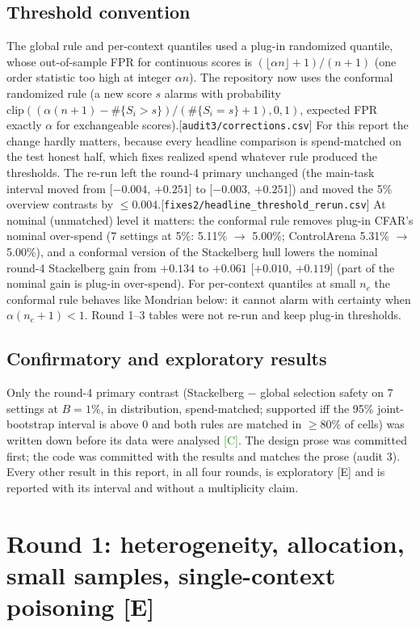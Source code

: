 \documentclass[11pt]{article}
\newcommand{\tC}{\textsf{\scriptsize\textcolor{ForestGreen}{[C]}}\xspace}
\newcommand{\tE}{\textsf{\scriptsize\textcolor{ink2}{[E]}}\xspace}
\newcommand{\src}[1]{{\footnotesize\textcolor{ink2}{[\nolinkurl{#1}]}}}
\begin{document}
\subsection{Threshold convention}\label{sec:thr}
The global rule and per-context quantiles used a plug-in randomized quantile, whose out-of-sample FPR for continuous scores is $(\lfloor\alpha n\rfloor+1)/(n+1)$ (one order statistic too high at integer $\alpha n$). The repository now uses the conformal randomized rule (a new score $s$ alarms with probability $\mathrm{clip}((\alpha(n+1)-\#\{S_i>s\})/(\#\{S_i=s\}+1),0,1)$, expected FPR exactly $\alpha$ for exchangeable scores).\src{audit3/corrections.csv} For this report the change hardly matters, because every headline comparison is spend-matched on the test honest half, which fixes realized spend whatever rule produced the thresholds. The re-run left the round-4 primary unchanged (the main-task interval moved from [$-0.004$, $+0.251$] to [$-0.003$, $+0.251$]) and moved the 5\% overview contrasts by $\le0.004$.\src{fixes2/headline_threshold_rerun.csv} At nominal (unmatched) level it matters: the conformal rule removes plug-in CFAR's nominal over-spend (7 settings at 5\%: 5.11\% $\to$ 5.00\%; ControlArena 5.31\% $\to$ 5.00\%), and a conformal version of the Stackelberg hull lowers the nominal round-4 Stackelberg gain from $+0.134$ to $+0.061$ [$+0.010$, $+0.119$] (part of the nominal gain is plug-in over-spend). For per-context quantiles at small $n_c$ the conformal rule behaves like Mondrian below: it cannot alarm with certainty when $\alpha(n_c+1)<1$. Round 1--3 tables were not re-run and keep plug-in thresholds.

\subsection{Confirmatory and exploratory results}
Only the round-4 primary contrast (Stackelberg $-$ global selection safety on 7 settings at $B=1\%$, in distribution, spend-matched; supported iff the 95\% joint-bootstrap interval is above 0 and both rules are matched in $\ge80\%$ of cells) was written down before its data were analysed \tC. The design prose was committed first; the code was committed with the results and matches the prose (audit 3). Every other result in this report, in all four rounds, is exploratory \tE and is reported with its interval and without a multiplicity claim.

\section{Round 1: heterogeneity, allocation, small samples, single-context poisoning \tE}
\end{document}
